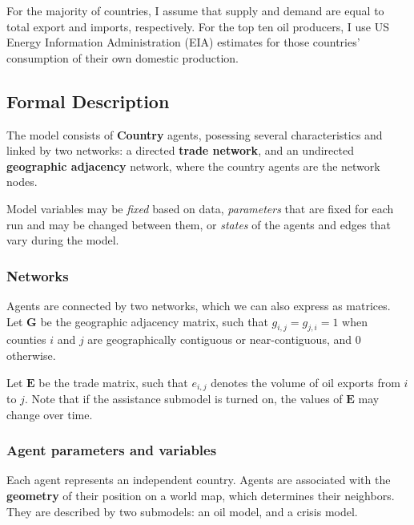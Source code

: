 \documentclass{article}
\begin{document}
For the majority of countries, I assume that supply and demand are equal to total export and imports, respectively. For the top ten oil producers, I use US Energy Information Administration (EIA) estimates \citep{} for those countries' consumption of their own domestic production. 

\subsection{Formal Description}

The model consists of \textbf{Country} agents, posessing several characteristics and linked by two networks: a directed \textbf{trade network}, and an undirected \textbf{geographic adjacency} network, where the country agents are the network nodes.

Model variables may be \emph{fixed} based on data, \emph{parameters} that are fixed for each run and may be changed between them, or \emph{states} of the agents and edges that vary during the model.

\subsubsection{Networks}

Agents are connected by two networks, which we can also express as matrices. Let $\mathbf{G}$ be the geographic adjacency matrix, such that $g_{i,j}=g_{j,i}=1$ when counties $i$ and $j$ are geographically contiguous or near-contiguous, and $0$ otherwise. 

Let $\mathbf{E}$ be the trade matrix, such that $e_{i,j}$ denotes the volume of oil exports from $i$ to $j$. Note that if the assistance submodel is turned on, the values of $\mathbf{E}$ may change over time.

\subsubsection{Agent parameters and variables}

Each agent represents an independent country. Agents are associated with the \textbf{geometry} of their position on a world map, which determines their neighbors. They are described by two submodels: an oil model, and a crisis model.
\end{document}
